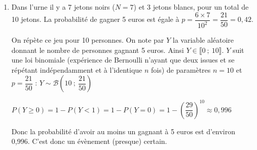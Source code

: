 \begin{enumerate}
\begin{enumerate}
$\dfrac{-36N + 252}{(N + 3)^2}=\dfrac{-36(N - 7)}{(N + 3)^2}$

 $f'(N)=0 \iff N=7$.

 Le gain moyen du joueur est maximal lorsque dans l'urne il y a 7 jetons noirs et 3 jetons blancs.
\end{enumerate}
\item Dans l'urne il y a 7 jetons noirs ($N=7$) et 3 jetons blancs, pour un total de 10 jetons. La probabilité de gagner 5 euros est égale à $p=\dfrac{6\times7}{10^2}=\dfrac{21}{50}=0,42$.

On répète ce jeu pour 10 personnes. On note par $Y$ la variable aléatoire donnant le nombre de personnes gagnant 5 euros. Ainsi $Y \in \llbracket0~;~10 \rrbracket$. $Y$ suit une loi binomiale (expérience de Bernoulli n'ayant que deux issues et se répétant indépendamment et à l'identique $n$ fois) de paramètres $n=10$ et $p=\dfrac{21}{50}$ : $Y \sim \mathcal{B}\left(10~;~\dfrac{21}{50}\right)$

$P(Y\geqslant0)=1-P(Y<1)=1-P(Y=0)=1-\left(\dfrac{29}{50}\right)^{10}\approx 0,996$

Donc la probabilité d'avoir au moins un gagnant à 5 euros est d'environ 0,996. C'est donc un évènement (presque) certain.
\end{enumerate}
